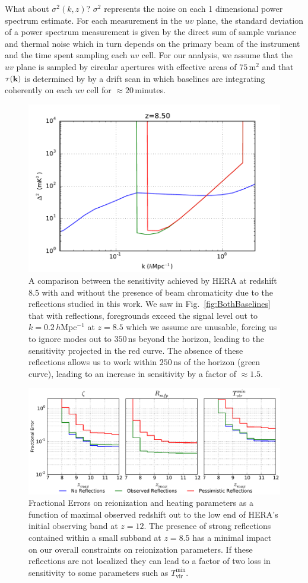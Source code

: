 \documentclass[twocolumn]{emulateapj}
\begin{document}
What about $\sigma^2(k,z)$? $\sigma^2$ represents the noise on each 1 dimensional power spectrum estimate. For each measurement in the $uv$ plane, the standard deviation of a power spectrum measurement is given by the direct sum of sample variance and thermal noise \citep{McQuinn:2006} which in turn depends on the primary beam of the instrument and the time spent sampling each $uv$ cell. For our analysis, we assume that the $uv$ plane is sampled by circular apertures with effective areas of $75$\,m$^2$ and that $\tau({\bf k})$ is determined by by a drift scan in which baselines are integrating coherently on each $uv$ cell for $\approx 20$\,minutes. 


\begin{figure}
\includegraphics[width=.5\textwidth]{figures/sensitivity_comparison_v2.pdf}
\caption{A comparison between the sensitivity achieved by HERA at redshift $8.5$ with and without the presence of beam chromaticity due to the reflections studied in this work. We saw in Fig.~\ref{fig:BothBaselines} that with reflections, foregrounds exceed the signal level out to $k=0.2$\,$h$Mpc$^{-1}$ at $z=8.5$ which we assume are unusable, forcing us to ignore modes out to $350$\,ns beyond the horizon, leading to the sensitivity projected in the red curve. The absence of these reflections allows us to work within $250$\,ns of the horizon (green curve), leading to an increase in sensitivity by a factor of $\approx 1.5$. }
\label{fig:Sensitivity}
\end{figure}



\begin{figure}
\includegraphics[width=\textwidth]{figures/sigmaVsZ_reionization_v2.pdf}
\caption{Fractional Errors on reionization and heating parameters as a function of maximal observed redshift out to the low end of HERA's initial observing band at $z=12$. The presence of strong reflections contained within a small subband at $z=8.5$ has a minimal impact on our overall constraints on reionization parameters. If these reflections are not localized they can lead to a factor of two loss in sensitivity to some parameters such as $T_\text{vir}^\text{min}$.}
\label{fig:Errors}
\end{figure}
\end{document}
